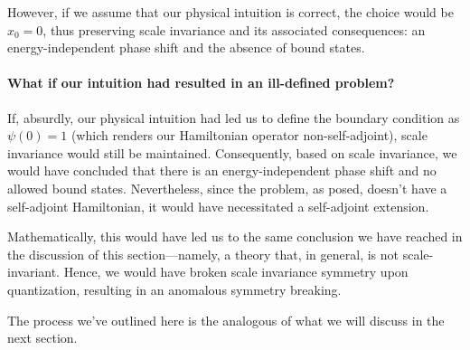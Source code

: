 However, if we assume that our physical intuition is correct, the choice would be ${x_0} = 0$, thus preserving scale invariance and its associated consequences: an energy-independent phase shift and the absence of bound states.

\paragraph*{What if our intuition had resulted in an ill-defined problem?}
If, absurdly, our physical intuition had led us to define the boundary condition as $\psi(0) = 1$ (which renders our Hamiltonian operator non-self-adjoint), scale invariance would still be maintained. 
Consequently, based on scale invariance, we would have concluded that there is an energy-independent phase shift and no allowed bound states. 
Nevertheless, since the problem, as posed, doesn't have a self-adjoint Hamiltonian, it would have necessitated a self-adjoint extension.

Mathematically, this would have led us to the same conclusion we have reached in the discussion of this section—namely, a theory that, in general, is not scale-invariant. 
Hence, we would have broken scale invariance symmetry upon quantization, resulting in an anomalous symmetry breaking.

\vspace{4mm}
\noindent
The process we've outlined here is the analogous of what we will discuss in the next section.